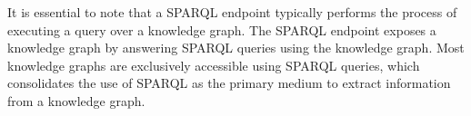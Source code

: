 It is essential to note that a SPARQL endpoint typically performs the process of executing a query over a knowledge graph. The SPARQL endpoint exposes a knowledge graph by answering SPARQL queries using the knowledge graph. Most knowledge graphs are exclusively accessible using SPARQL queries, which consolidates the use of SPARQL as the primary medium to extract information from a knowledge graph.
